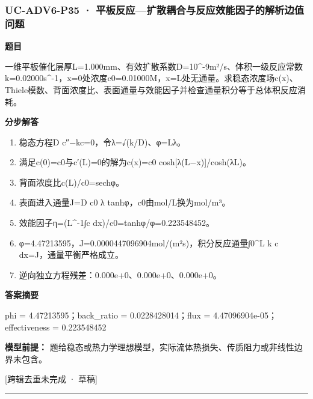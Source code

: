 \documentclass[UTF8,11pt,a4paper]{ctexart}
\begin{document}
\subsubsection*{UC-ADV6-P35 · 平板反应—扩散耦合与反应效能因子的解析边值问题}
\noindent\textbf{题目}\par
一维平板催化层厚L=1.000mm、有效扩散系数D=10\textasciicircum{}-9m²/s、体积一级反应常数k=0.02000s\textasciicircum{}-1，x=0处浓度c0=0.01000M，x=L处无通量。求稳态浓度场c(x)、Thiele模数、背面浓度比、表面通量与效能因子并检查通量积分等于总体积反应消耗。\par
\medskip\noindent\textbf{分步解答}
\begin{enumerate}
\item 稳态方程D c″−kc=0，令λ=√(k/D)、φ=Lλ。
\item 满足c(0)=c0与c′(L)=0的解为c(x)=c0 cosh[λ(L−x)]/cosh(λL)。
\item 背面浓度比c(L)/c0=sechφ。
\item 表面进入通量J=D c0 λ tanhφ，c0由mol/L换为mol/m³。
\item 效能因子η=(L\textasciicircum{}-1∫c dx)/c0=tanhφ/φ=0.223548452。
\item φ=4.47213595，J=0.0000447096904mol/(m²s)，积分反应通量∫0\textasciicircum{}L k c dx=J，通量平衡严格成立。
\item 逆向独立方程残差：0.000e+0、0.000e+0、0.000e+0。
\end{enumerate}
\noindent\textbf{答案摘要}\par
phi = 4.47213595；back\_ratio = 0.0228428014；flux = 4.47096904e-05；effectiveness = 0.223548452\par
\noindent\textbf{模型前提：}
题给稳态或热力学理想模型，实际流体热损失、传质阻力或非线性边界未包含。\par
\noindent\textcolor{red!65!black}{[跨辑去重未完成 · 草稿]} \par
\medskip\hrule\medskip
{}
\end{document}
